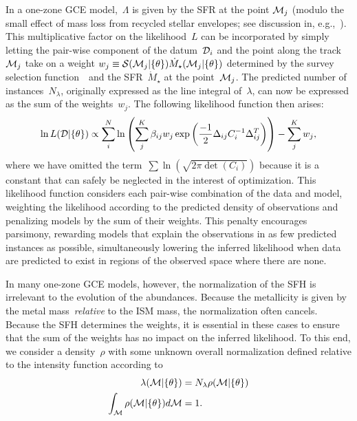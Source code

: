 \documentclass[ms.tex]{subfiles}
\begin{document}
In a one-zone GCE model,~$\Lambda$ is given by the SFR at the point
$\mathcal{M}_j$ (modulo the small effect of mass loss from recycled stellar
envelopes; see discussion in, e.g.,~\citealt{Weinberg2017}).
This multiplicative factor on the likelihood~$L$ can be incorporated by simply
letting the pair-wise component of the datum~$\mathcal{D}_i$ and the point along
the track~$\mathcal{M}_j$ take on a weight
$w_j \equiv \mathcal{S}(\mathcal{M}_j | \{\theta\}) \dot{M}_\star(\mathcal{M}_j |
\{\theta\})$ determined by the survey selection function~~and the
SFR~$\dot{M}_\star$ at the point~$\mathcal{M}_j$.
The predicted number of instances~$N_\lambda$, originally expressed as the
line integral of~$\lambda$, can now be expressed as the sum of the
weights~$w_j$.
The following likelihood function then arises:
\begin{equation}
\ln L(\mathcal{D} | \{\theta\}) \propto
\sum_i^N \ln \left(\sum_j^K
\beta_{ij} w_j \exp\left(\frac{-1}{2}\Delta_{ij} C_i^{-1} \Delta_{ij}^T\right)
\right) - \sum_j^K w_j,
\label{eq:lnL_minus_weights}
\end{equation}
where we have omitted the term~$\sum \ln \left(\sqrt{2\pi \det{(C_i)}}\right)$
because it is a constant that can safely be neglected in the interest of
optimization.
This likelihood function considers each pair-wise combination of the data and
model, weighting the likelihood according to the predicted density of
observations and penalizing models by the sum of their weights.
This penalty encourages parsimony, rewarding models that explain the
observations in as few predicted instances as possible, simultaneously lowering
the inferred likelihood when data are predicted to exist in regions of the
observed space where there are none.
\par
In many one-zone GCE models, however, the normalization of the SFH is
irrelevant to the evolution of the abundances.
Because the metallicity is given by the metal mass~\textit{relative} to the ISM
mass, the normalization often cancels.
Because the SFH determines the weights, it is essential in these cases to
ensure that the sum of the weights has no impact on the inferred likelihood.
To this end, we consider a density~$\rho$ with some unknown overall
normalization defined relative to the intensity function according to
\begin{subequations}\begin{align}
\lambda(\mathcal{M} | \{\theta\}) &= N_\lambda \rho(\mathcal{M} | \{\theta\})
\\
\int_{\mathcal{M}} \rho(\mathcal{M} | \{\theta\}) d\mathcal{M} &= 1.
\end{align}\end{subequations}
\end{document}
